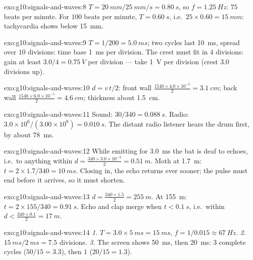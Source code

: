 \begin{solution}{exo:g10:signals-and-waves:8}
$T = \qty{20}{mm}/\qty{25}{mm/s} = \qty{0.80}{s}$, so
$f = \qty{1.25}{Hz}$: $75$ beats per minute. For $100$ beats per minute,
$T = \qty{0.60}{s}$, i.e.\ $25 \times 0.60 = \qty{15}{mm}$: tachycardia
shows below \qty{15}{mm}.
\end{solution}

\begin{solution}{exo:g10:signals-and-waves:9}
$T = 1/200 = \qty{5.0}{ms}$; two cycles last \qty{10}{ms}, spread over
$10$ divisions: time base \qty{1}{ms} per division. The crest must fit
in $4$ divisions: gain at least $3.0/4 = \qty{0.75}{V}$ per division ---
take \qty{1}{V} per division (crest $3.0$ divisions up).
\end{solution}

\begin{solution}{exo:g10:signals-and-waves:10}
$d = v\,t/2$: front wall
$\frac{1540 \times 4.0\times10^{-5}}{2} = \qty{3.1}{cm}$; back wall
$\frac{1540 \times 6.0\times10^{-5}}{2} = \qty{4.6}{cm}$; thickness
about \qty{1.5}{cm}.
\end{solution}

\begin{solution}{exo:g10:signals-and-waves:11}
Sound: $30/340 = \qty{0.088}{s}$. Radio:
$3.0\times10^{6}/(3.00\times10^{8}) = \qty{0.010}{s}$. The distant radio
listener hears the drum first, by about \qty{78}{ms}.
\end{solution}

\begin{solution}{exo:g10:signals-and-waves:12}
While emitting for \qty{3.0}{ms} the bat is deaf to echoes, i.e.\ to
anything within $d = \frac{340 \times 3.0\times10^{-3}}{2} =
\qty{0.51}{m}$. Moth at \qty{1.7}{m}:
$t = 2 \times 1.7/340 = \qty{10}{ms}$. Closing in, the echo returns ever
sooner; the pulse must end before it arrives, so it must shorten.
\end{solution}

\begin{solution}{exo:g10:signals-and-waves:13}
$d = \frac{340 \times 1.5}{2} = \qty{255}{m}$. At \qty{155}{m}:
$t = 2 \times 155/340 = \qty{0.91}{s}$. Echo and clap merge when
$t < \qty{0.1}{s}$, i.e.\ within
$d < \frac{340 \times 0.1}{2} = \qty{17}{m}$.
\end{solution}

\begin{solution}{exo:g10:signals-and-waves:14}
\emph{1.} $T = 3.0 \times \qty{5}{ms} = \qty{15}{ms}$,
$f = 1/0.015 \approx \qty{67}{Hz}$.
\emph{2.} $\qty{15}{ms}/\qty{2}{ms} = 7.5$ divisions.
\emph{3.} The screen shows \qty{50}{ms}, then \qty{20}{ms}: $3$ complete
cycles ($50/15 = 3.3$), then $1$ ($20/15 = 1.3$).
\end{solution}

